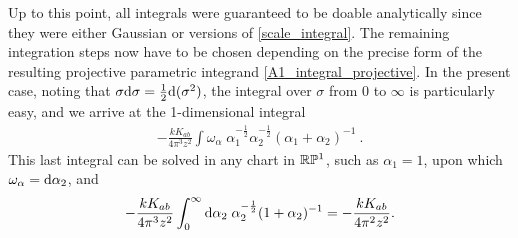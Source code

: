 \documentclass[11pt]{amsart}
\numberwithin{equation}{section}
\numberwithin{figure}{section}
\numberwithin{table}{section}
\begin{document}
Up to this point, all integrals were guaranteed to be doable analytically since they were either Gaussian or versions of \cref{scale_integral}.
The remaining integration steps now have to be chosen depending on the precise form of the resulting projective parametric integrand \cref{A1_integral_projective}.
In the present case, noting that $\sigma \mathrm{d} \sigma = \frac 12 \mathrm{d} (\sigma^2)$, the integral over $\sigma$ from $0$ to $\infty$ is particularly easy, and we arrive at the 1-dimensional integral
\begin{align}\label{A1_integral1_last}
	-\frac{k K_{ab}}{4\pi^3 z^2} \int \omega_\alpha \; \alpha_1^{-\frac 12} \alpha_2^{-\frac 12} (\alpha_1+\alpha_2)^{-1}~.
\end{align} 
This last integral can be solved in any chart in ${\mathbb R} \mathbb{P}^1$, such as $\alpha_1=1$, upon which $\omega_\alpha= \mathrm{d} \alpha_2$, and  
\begin{align}\label{A1_integral1_solution}
 -\frac{k K_{ab}}{4\pi^3 z^2} \int_0^\infty \mathrm{d} \alpha_2 \;  \alpha_2^{-\frac 12} (1+\alpha_2)^{-1} = -\frac{k K_{ab}}{4\pi^2 z^2}.
\end{align}
\end{document}
